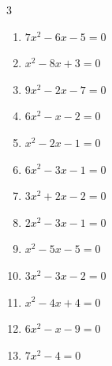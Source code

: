 \begin{multicols}{3}
\begin{enumerate}
  \item $7x^{2}-6x-5=0$


  \item $x^{2}-8x+3=0$


  \item $9x^{2}-2x-7=0$


  \item $6x^{2}-x-2=0$


  \item $x^{2}-2x-1=0$


  \item $6x^{2}-3x-1=0$


\columnbreak %

\resetques

  \item $3x^{2}+2x-2=0$


  \item $2x^{2}-3x-1=0$


  \item $x^{2}-5x-5=0$


  \item $3x^{2}-3x-2=0$


  \item $x^{2}-4x+4=0$

        \phantom{$\displaystyle x=2$}

  \item $6x^{2}-x-9=0$


  \item $7x^{2}-4=0$


\end{enumerate}
\end{multicols}
